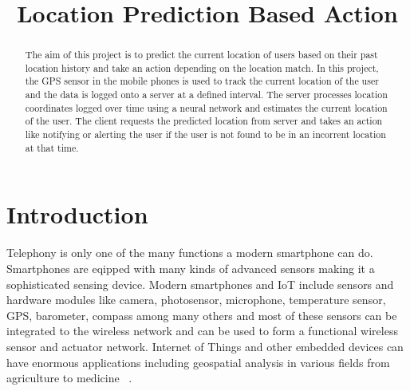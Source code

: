 \documentclass[conference]{IEEEtran}
\begin{document}
%
\title{Location Prediction Based Action}


\author{
}

\maketitle


\begin{abstract}
The aim of this project is to  predict the current location of users based on their past location history and take an action depending on the location match. In this project, the GPS sensor in the mobile phones is used to track the current location of the user and the data is logged onto a server at a defined interval. The server processes location coordinates logged over time using a neural network and estimates the current location of the user. The client requests the predicted location from server and takes an action like notifying or alerting the user if the user is not found to be in an incorrent location at that time.
\end{abstract}

\IEEEpeerreviewmaketitle



\section{Introduction}
Telephony is only one of the many functions a modern smartphone can do. Smartphones are eqipped with many kinds of advanced sensors making it a sophisticated sensing device. Modern smartphones and IoT include sensors and hardware modules like camera, photosensor, microphone, temperature sensor, GPS, barometer, compass among many others and most of these sensors can be integrated to the wireless network and can be used to form a functional wireless sensor and actuator network. Internet of Things and other embedded devices can have enormous applications including geospatial analysis in various fields from agriculture to medicine ~\cite{iot1}.
\end{document}
